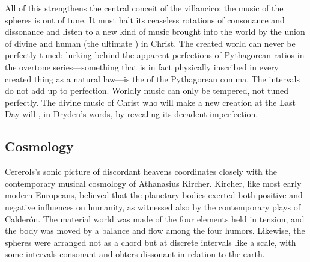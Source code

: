 All of this strengthens the central conceit of the villancico: the music of the
spheres is out of tune.
It must halt its ceaseless rotations of consonance and dissonance and listen to
a new kind of music brought into the world by the union of divine and human (the
ultimate ) in Christ.
The created world can never be perfectly tuned: lurking behind the apparent
perfections of Pythagorean ratios in the overtone series---something that is in
fact physically inscribed in every created thing as a natural law---is the
 of the Pythagorean comma.%
The intervals do not add up to perfection.
Worldly music can only be tempered, not tuned perfectly.
The divine music of Christ who will make a new creation at the Last Day will
, in Dryden's words, by revealing its decadent
imperfection.

\subsection{Cosmology}

Cererols's sonic picture of discordant heavens coordinates closely with the
contemporary musical cosmology of Athanasius Kircher.
Kircher, like most early modern Europeans, believed that the planetary bodies
exerted both positive and negative influences on humanity, as witnessed also by
the contemporary plays of Calderón.%
The material world was made of the four elements held in tension, and the body
was moved by a balance and flow among the four humors. 
Likewise, the spheres were arranged not as a chord but at discrete intervals
like a scale, with some intervals consonant and ohters dissonant in relation to
the earth.

